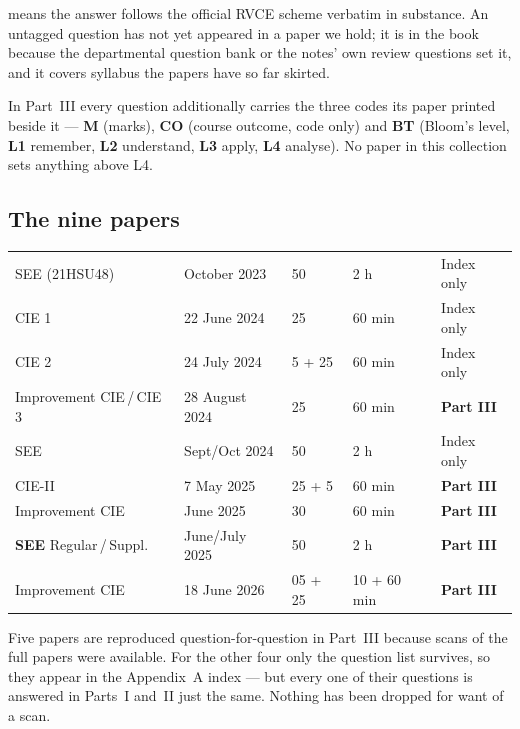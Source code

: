 \vspace{4pt}
 means the answer follows the official RVCE scheme verbatim in
substance. An untagged question has not yet appeared in a paper we hold; it is
in the book because the departmental question bank or the notes' own review
questions set it, and it covers syllabus the papers have so far skirted.

In Part~III every question additionally carries the three codes its paper
printed beside it --- \textbf{M} (marks), \textbf{CO} (course outcome, code
only) and \textbf{BT} (Bloom's level, \textbf{L1} remember, \textbf{L2}
understand, \textbf{L3} apply, \textbf{L4} analyse). No paper in this
collection sets anything above L4.

\subsection*{The nine papers}

\renewcommand{\arraystretch}{1.35}
\begin{tabular}{@{}P{46mm} P{32mm} C{20mm} C{20mm} C{28mm}@{}}
 &  &  &  &  \\
\hline
SEE (21HSU48) & October 2023 & 50 & 2 h & Index only \\ \hline
CIE 1 & 22 June 2024 & 25 & 60 min & Index only \\ \hline
CIE 2 & 24 July 2024 & 5 + 25 & 60 min & Index only \\ \hline
Improvement CIE\,/\,CIE 3 & 28 August 2024 & 25 & 60 min &
  \textbf{Part III} \\ \hline
SEE & Sept/Oct 2024 & 50 & 2 h & Index only \\ \hline
CIE-II & 7 May 2025 & 25 + 5 & 60 min & \textbf{Part III} \\ \hline
Improvement CIE & June 2025 & 30 & 60 min & \textbf{Part III} \\ \hline
\textbf{SEE} Regular\,/\,Suppl. & June/July 2025 & 50 & 2 h &
  \textbf{Part III} \\ \hline
Improvement CIE & 18 June 2026 & 05 + 25 & 10 + 60 min &
  \textbf{Part III} \\ \hline
\end{tabular}

\vspace{6pt}
Five papers are reproduced question-for-question in Part~III because scans of
the full papers were available. For the other four only the question list
survives, so they appear in the Appendix~A index --- but every one of their
questions is answered in Parts~I and~II just the same. Nothing has been
dropped for want of a scan.

